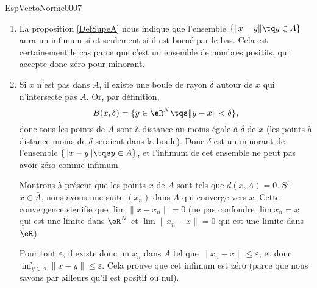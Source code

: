 \begin{corrige}{EspVectoNorme0007}

	\begin{enumerate}
		\item
			La proposition \ref{DefSupeA} nous indique que l'ensemble $\{ \| x-y \|\tq y\in A \}$ aura un infimum si et seulement si il est borné par le bas. Cela est certainement le cas parce que c'est un ensemble de nombres positifs, qui accepte donc zéro pour minorant.

		\item
			Si $x$ n'est pas dans $\bar A$, il existe une boule de rayon $\delta$ autour de $x$ qui n'intersecte pas $A$. Or, par définition,
			\begin{equation}
				B(x,\delta)=\{ y\in\eR^N\tqs\| y-x \|<\delta \},
			\end{equation}
			donc tous les points de $A$ sont à distance au moins égale à $\delta$ de $x$ (les points à distance moins de $\delta$ seraient dans la boule). Donc $\delta$ est un minorant de l'ensemble $\{ \| x-y \|\tqs y\in A \}$, et l'infimum de cet ensemble ne peut pas avoir zéro comme infimum.

			Montrons à présent que les points $x$ de $\bar A$ sont tels que $d(x,A)=0$. Si $x\in\bar A$, nous avons une suite $(x_n)$ dans $A$ qui converge vers $x$. Cette convergence signifie que $\lim\| x-x_n \|=0$ (ne pas confondre $\lim x_n=x$ qui est une limite dans $\eR^N$ et $\lim\| x_n-x \|=0$ qui est une limite dans $\eR$).

			Pour tout $\varepsilon$, il existe donc un $x_n$ dans $A$ tel que $\| x_n-x \|\leq\varepsilon$, et donc $\inf_{y\in A}\| x-y \|\leq\varepsilon$. Cela prouve que cet infimum est zéro (parce que nous savons par ailleurs qu'il est positif ou nul).
			
	\end{enumerate}

\end{corrige}
